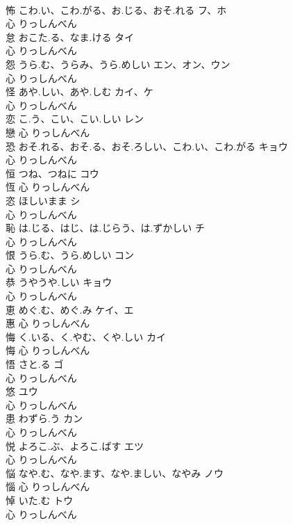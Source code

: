 \documentclass[8pt]{extreport}
\begin{document}
\begin{CJK}{UTF8}{min}
\\	怖	こわ.い、こわ.がる、お.じる、おそ.れる	フ、ホ	
\\	心		りっしんべん		
\\	怠	おこた.る、なま.ける	タイ	
\\	心		りっしんべん		
\\	怨	うら.む、うらみ、うら.めしい	エン、オン、ウン	
\\	心		りっしんべん		
\\	怪	あや.しい、あや.しむ	カイ、ケ	
\\	心		りっしんべん		
\\	恋	こ.う、こい、こい.しい	レン	
\\	戀	心		りっしんべん		
\\	恐	おそ.れる、おそ.る、おそ.ろしい、こわ.い、こわ.がる	キョウ	
\\	心		りっしんべん		
\\	恒	つね、つねに	コウ	
\\	恆	心		りっしんべん		
\\	恣	ほしいまま	シ	
\\	心		りっしんべん		
\\	恥	は.じる、はじ、は.じらう、は.ずかしい	チ	
\\	心		りっしんべん		
\\	恨	うら.む、うら.めしい	コン	
\\	心		りっしんべん		
\\	恭	うやうや.しい	キョウ	
\\	心		りっしんべん		
\\	恵	めぐ.む、めぐ.み	ケイ、エ	
\\	惠	心		りっしんべん		
\\	悔	く.いる、く.やむ、くや.しい	カイ	
\\	悔	心		りっしんべん		
\\	悟	さと.る	ゴ	
\\	心		りっしんべん		
\\	悠		ユウ	
\\	心		りっしんべん		
\\	患	わずら.う	カン	
\\	心		りっしんべん		
\\	悦	よろこ.ぶ、よろこ.ばす	エツ	
\\	心		りっしんべん		
\\	悩	なや.む、なや.ます、なや.ましい、なやみ	ノウ	
\\	惱	心		りっしんべん		
\\	悼	いた.む	トウ	
\\	心		りっしんべん		

\end{CJK}
\end{document}
